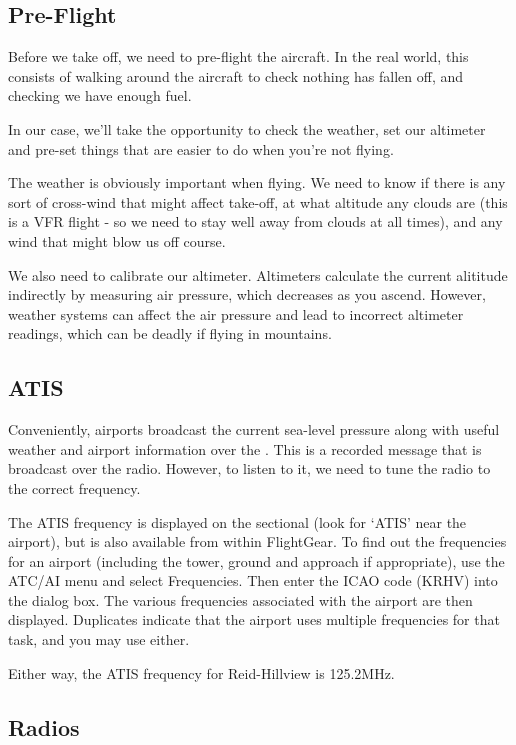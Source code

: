 \subsection{Pre-Flight}

Before we take off, we need to pre-flight the aircraft. In the real world,
this consists of walking around the aircraft to check nothing has fallen
off, and checking we have enough fuel.

In our case, we'll take the opportunity to check the weather, set our
altimeter and pre-set things that are easier to do when you're not flying.

The weather is obviously important when flying. We need to know if
there is any sort of cross-wind that might affect take-off, at what
altitude any clouds are (this is a VFR flight - so we need to stay
well away from clouds at all times), and any wind that might blow us off course.

We also need to calibrate our altimeter. Altimeters calculate the
current alititude indirectly by measuring air pressure, which decreases
as you ascend. However, weather systems can affect the air pressure and
lead to incorrect altimeter readings, which can be deadly if flying in mountains.

\subsection{ATIS}

Conveniently, airports broadcast the current sea-level pressure along
with useful weather and airport information over the .
This is a recorded message that is broadcast over the radio.
However, to listen to it, we need to tune the radio to the correct frequency.

The ATIS frequency is displayed on the sectional (look for `ATIS' near the airport), but is also
available from within FlightGear. To find out the frequencies for an
airport (including the tower, ground and approach if appropriate),
use the ATC/AI menu and select Frequencies. Then enter the ICAO code
(KRHV) into the dialog box. The various frequencies associated with the
airport are then displayed. Duplicates indicate that the airport uses
multiple frequencies for that task, and you may use either.

Either way, the ATIS frequency for Reid-Hillview is 125.2MHz.

\subsection{Radios}

